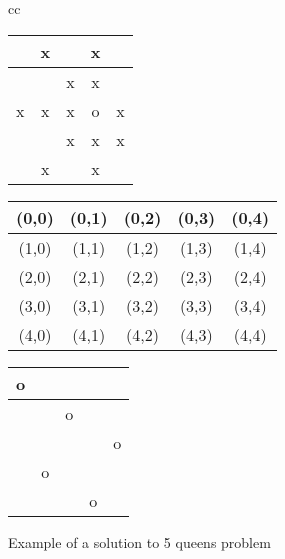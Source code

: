 \begin{figure}[htbp]
\begin{tabular}{cc}

\begin{minipage}{0.30\hsize}
\begin{center}
{\small
\begin{tabular}{|c|c|c|c|c|}
\hline
 &x& &x&\\
\hline
 & &x&x&\\
\hline
x&x&x&o&x\\
\hline
 & &x&x&x\\
\hline
 &x& &x&\\
\hline
\end{tabular}
}
\caption{The queen indicated as "o" can move to the squares marked as "x".\label{fig:tut_queen_move}}
\end{center}
\end{minipage}

\begin{minipage}{0.40\hsize}
\begin{center}
{\small
\begin{tabular}{|c|c|c|c|c|}
\hline
(0,0)&(0,1)&(0,2)&(0,3)&(0,4)\\
\hline
(1,0)&(1,1)&(1,2)&(1,3)&(1,4)\\
\hline
(2,0)&(2,1)&(2,2)&(2,3)&(2,4)\\
\hline
(3,0)&(3,1)&(3,2)&(3,3)&(3,4)\\
\hline
(4,0)&(4,1)&(4,2)&(4,3)&(4,4)\\
\hline
\end{tabular}
}
\caption{Coordinates of the $5\times 5$\label{fig:tut_chess} chessboard}
\end{center}
\end{minipage}

\begin{minipage}{0.25\hsize}
\begin{center}
{\small
\begin{tabular}{|c|c|c|c|c|}
\hline
o& & & &\\
\hline
 & &o& &\\
\hline
 & & & &o\\
\hline
 &o& & &\\
\hline
 & & &o&\\
\hline
\end{tabular}
}
\caption{Example of a solution to 5 queens problem\label{fig:tut_nqueen_sol1}}
\end{center}
\end{minipage}

\end{tabular}
\end{figure}

